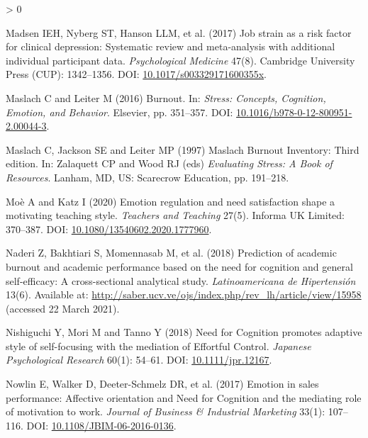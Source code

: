 \documentclass[
  english,
  man,floatsintext]{apa6}
\newlength{\cslhangindent}
\newenvironment{CSLReferences}[2] %
 {%
  \setlength{\parindent}{0pt}
  \ifodd #1 \everypar{\setlength{\hangindent}{\cslhangindent}}\ignorespaces\fi
  \ifnum #2 > 0
  \setlength{\parskip}{#2\baselineskip}
  \fi
 }%
 {}
\begin{document}
\begin{CSLReferences}{1}{0}
\leavevmode\hypertarget{ref-Madsen2017}{}%
Madsen IEH, Nyberg ST, Hanson LLM, et al. (2017) Job strain as a risk factor for clinical depression: Systematic review and meta-analysis with additional individual participant data. \emph{Psychological Medicine} 47(8). Cambridge University Press ({CUP}): 1342--1356. DOI: \href{https://doi.org/10.1017/s003329171600355x}{10.1017/s003329171600355x}.

\leavevmode\hypertarget{ref-Maslach2016}{}%
Maslach C and Leiter M (2016) Burnout. In: \emph{Stress: Concepts, Cognition, Emotion, and Behavior}. Elsevier, pp. 351--357. DOI: \href{https://doi.org/10.1016/b978-0-12-800951-2.00044-3}{10.1016/b978-0-12-800951-2.00044-3}.

\leavevmode\hypertarget{ref-Maslach1997}{}%
Maslach C, Jackson SE and Leiter MP (1997) Maslach {Burnout} {Inventory}: {Third} edition. In: Zalaquett CP and Wood RJ (eds) \emph{Evaluating Stress: A Book of Resources}. Lanham, MD, US: Scarecrow Education, pp. 191--218.

\leavevmode\hypertarget{ref-Moe2020}{}%
Moè A and Katz I (2020) Emotion regulation and need satisfaction shape a motivating teaching style. \emph{Teachers and Teaching} 27(5). Informa {UK} Limited: 370--387. DOI: \href{https://doi.org/10.1080/13540602.2020.1777960}{10.1080/13540602.2020.1777960}.

\leavevmode\hypertarget{ref-Naderi2018}{}%
Naderi Z, Bakhtiari S, Momennasab M, et al. (2018) Prediction of academic burnout and academic performance based on the need for cognition and general self-efficacy: {A} cross-sectional analytical study. \emph{Latinoamericana de Hipertensión} 13(6). Available at: \url{http://saber.ucv.ve/ojs/index.php/rev_lh/article/view/15958} (accessed 22 March 2021).

\leavevmode\hypertarget{ref-Nishiguchi2018}{}%
Nishiguchi Y, Mori M and Tanno Y (2018) Need for {Cognition} promotes adaptive style of self-focusing with the mediation of {Effortful} {Control}. \emph{Japanese Psychological Research} 60(1): 54--61. DOI: \href{https://doi.org/10.1111/jpr.12167}{10.1111/jpr.12167}.

\leavevmode\hypertarget{ref-Nowlin2017}{}%
Nowlin E, Walker D, Deeter-Schmelz DR, et al. (2017) Emotion in sales performance: Affective orientation and {Need} for {Cognition} and the mediating role of motivation to work. \emph{Journal of Business \& Industrial Marketing} 33(1): 107--116. DOI: \href{https://doi.org/10.1108/JBIM-06-2016-0136}{10.1108/JBIM-06-2016-0136}.


\end{CSLReferences}
\end{document}

